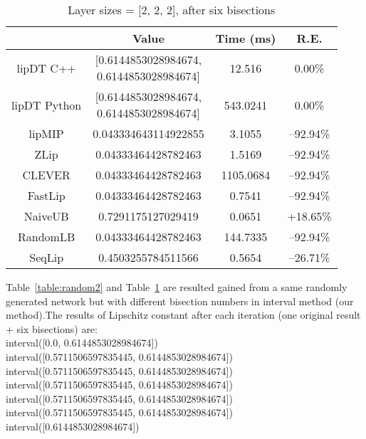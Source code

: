 \documentclass[11pt]{article}
\begin{document}
\begin{table}[H]
\centering
\caption{Layer sizes = [2, 2, 2], after six bisections}
\begin{tabular}{|c|c|c|c|}
\hline
                & Value                              & Time (ms)      & R.E. \\ \hline
lipDT C++ &  \makecell*[c]{[0.6144853028984674,\\ 0.6144853028984674]} & 12.516 & 0.00\%    \\ \hline
lipDT Python &  \makecell*[c]{[0.6144853028984674,\\ 0.6144853028984674]} & 543.0241 & 0.00\%    \\ \hline
lipMIP          & 0.043334643114922855               & 3.1055   & --92.94\% \\ \hline
ZLip            & 0.04333464428782463                & 1.5169     & --92.94\%\\ \hline
CLEVER          & 0.04333464428782463				 & 1105.0684 & --92.94\%\\ \hline
FastLip         & 0.04333464428782463				 & 0.7541    & --92.94\% \\ \hline
NaiveUB         & 0.7291175127029419				 & 0.0651    & +18.65\% \\ \hline
RandomLB        & 0.04333464428782463				 & 144.7335  & --92.94\% \\ \hline
SeqLip          & 0.4503255784511566                                                                                             & 0.5654 & --26.71\%  \\ \hline
\end{tabular}
\label{table:random3}
\end{table}

Table~\ref{table:random2} and Table~\ref{table:random3} are resulted gained from a same randomly generated network but with different bisection numbers in interval method (our method).The results of Lipschitz constant after each iteration (one original result + six bisections) are:\\
interval([0.0, 0.6144853028984674])\\
interval([0.5711506597835445, 0.6144853028984674])\\
interval([0.5711506597835445, 0.6144853028984674])\\
interval([0.5711506597835445, 0.6144853028984674])\\
interval([0.5711506597835445, 0.6144853028984674])\\
interval([0.5711506597835445, 0.6144853028984674])\\
interval([0.6144853028984674])\\
\end{document}
